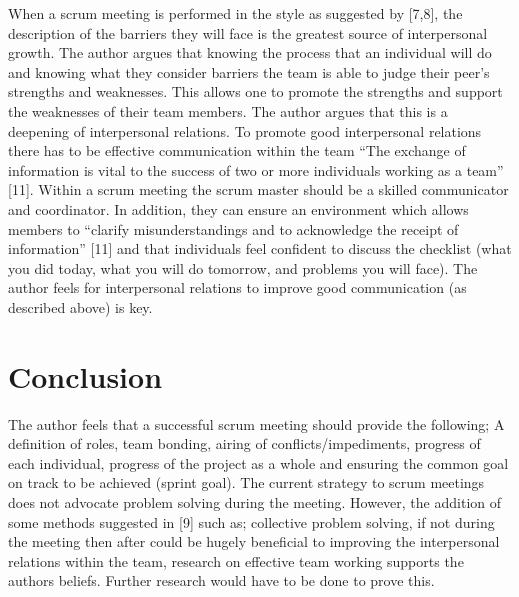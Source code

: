 \documentclass{scrartcl}
\begin{document}
When a scrum meeting is performed in the style as suggested by [7,8], the description of the barriers they will face is the greatest source of interpersonal growth. The author argues that knowing the process that an individual will do and knowing what they consider barriers the team is able to judge their peer’s strengths and weaknesses. This allows one to promote the strengths and support the weaknesses of their team members. The author argues that this is a deepening of interpersonal relations.
To promote good interpersonal relations there has to be effective communication within the team “The exchange of information is vital to the success of two or more individuals working as a team” [11]. Within a scrum meeting the scrum master should be a skilled communicator and coordinator. In addition, they can ensure an environment which allows members to “clarify misunderstandings and to acknowledge the receipt of information” [11] and that individuals feel confident to discuss the checklist (what you did today, what you will do tomorrow, and problems you will face). The author feels for interpersonal relations to improve good communication (as described above) is key. 


\section{Conclusion}

The author feels that a successful scrum meeting should provide the following; A definition of roles, team bonding, airing of conflicts/impediments, progress of each individual, progress of the project as a whole and ensuring the common goal on track to be achieved (sprint goal).  The current strategy to scrum meetings does not advocate problem solving during the meeting. However, the addition of some methods suggested in [9] such as; collective problem solving, if not during the meeting then after could be hugely beneficial to improving the interpersonal relations within the team, research on effective team working supports the authors beliefs. Further research would have to be done to prove this.



\end{document}
